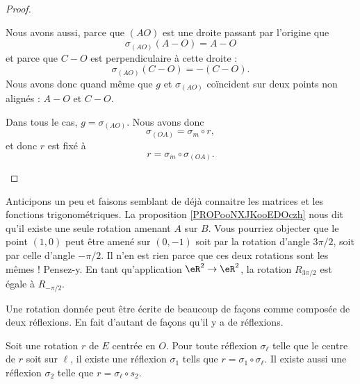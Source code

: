 \begin{proof}
\begin{subproof}
\begin{subproof}
            Nous avons aussi, parce que \( (AO)\) est une droite passant par l'origine que
            \begin{equation}
                \sigma_{(AO)}(A-O)=A-O
            \end{equation}
            et parce que \( C-O\) est perpendiculaire à cette droite :
            \begin{equation}
                \sigma_{(AO)}(C-O)=-(C-O).
            \end{equation}
            Nous avons donc quand même que \( g\) et \( \sigma_{(AO)}\) coïncident sur deux points non alignés : \( A-O\) et \( C-O\).

            \end{subproof}

            Dans tous le cas, \( g=\sigma_{(AO)}\). Nous avons donc
            \begin{equation}
                \sigma_{(OA)}=\sigma_m\circ r,
            \end{equation}
            et donc \( r\) est fixé à
            \begin{equation}
                r=\sigma_m\circ\sigma_{(OA)}.
            \end{equation}
    \end{subproof}
\end{proof}

\begin{normaltext}
    Anticipons un peu et faisons semblant de déjà connaitre les matrices et les fonctions trigonométriques. La proposition \ref{PROPooNXJKooEDOczh} nous dit qu'il existe une seule rotation amenant \( A\) sur \( B\). Vous pourriez objecter que le point \( (1,0)\) peut être amené sur \( (0,-1)\) soit par la rotation d'angle \( 3\pi/2\), soit par celle d'angle \( -\pi/2\). Il n'en est rien parce que ces deux rotations sont les mêmes ! Pensez-y. En tant qu'application \( \eR^2\to \eR^2\), la rotation \( R_{3\pi/2}\) est égale à \( R_{-\pi/2}\).
\end{normaltext}

Une rotation donnée peut être écrite de beaucoup de façons comme composée de deux réflexions. En fait d'autant de façons qu'il y a de réflexions.
\begin{proposition}      \label{PROPooKAZEooLTHWKe}
    Soit une rotation \( r\) de \( E\) centrée en \( O\). Pour toute réflexion \( \sigma_{\ell}\) telle que le centre de \( r\) soit sur \( \ell\), il existe une réflexion \( \sigma_1\) tells que \( r=\sigma_1\circ\sigma_{\ell}\). Il existe aussi une réflexion \( \sigma_2\) telle que \( r=\sigma_{\ell}\circ s_2\).
\end{proposition}

